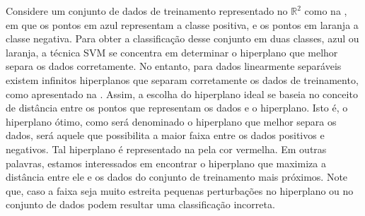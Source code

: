 \documentclass[12pt,a4paper]{scrartcl}
\def\RR{\mathds{R}}
\theoremstyle{definition}%
\begin{document}
Considere um conjunto de dados de treinamento representado no $\RR^2$ como na , em que os pontos em azul representam a classe positiva, e os pontos em laranja a classe negativa. Para obter a classificação desse conjunto em duas classes, azul ou laranja, a técnica SVM se concentra em determinar o hiperplano que melhor separa os dados corretamente. No entanto, para dados linearmente separáveis existem infinitos hiperplanos que separam corretamente os dados de treinamento, como apresentado na . Assim, a escolha do hiperplano ideal se baseia no conceito de distância entre os pontos que representam os dados e o hiperplano. Isto é, o hiperplano ótimo, como será denominado o hiperplano que melhor separa os dados, será aquele que possibilita a maior faixa entre os dados positivos e negativos. Tal hiperplano é representado na  pela cor vermelha. Em outras palavras, estamos interessados em encontrar o hiperplano que maximiza a distância entre ele e os dados do conjunto de treinamento mais próximos. Note que, caso a faixa seja muito estreita pequenas perturbações no hiperplano ou no conjunto de dados podem resultar uma classificação incorreta. 
\end{document}
